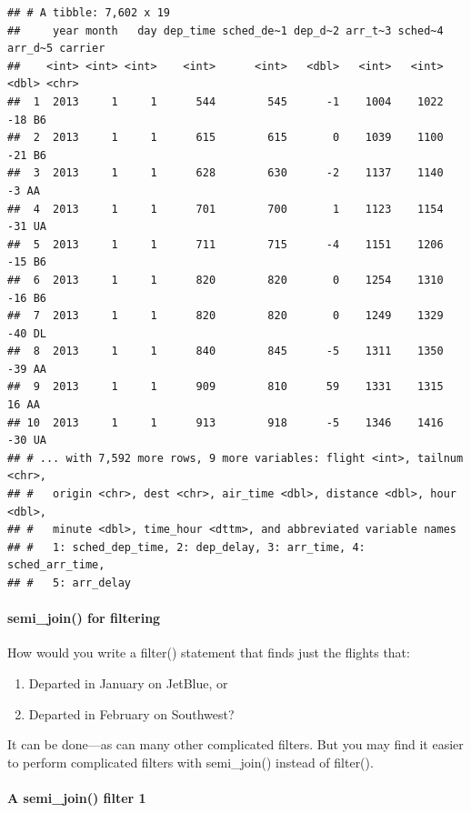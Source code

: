 \documentclass[
]{article}
\providecommand{\tightlist}{%
  \setlength{\itemsep}{0pt}\setlength{\parskip}{0pt}}
\begin{document}
\begin{verbatim}
## # A tibble: 7,602 x 19
##     year month   day dep_time sched_de~1 dep_d~2 arr_t~3 sched~4 arr_d~5 carrier
##    <int> <int> <int>    <int>      <int>   <dbl>   <int>   <int>   <dbl> <chr>  
##  1  2013     1     1      544        545      -1    1004    1022     -18 B6     
##  2  2013     1     1      615        615       0    1039    1100     -21 B6     
##  3  2013     1     1      628        630      -2    1137    1140      -3 AA     
##  4  2013     1     1      701        700       1    1123    1154     -31 UA     
##  5  2013     1     1      711        715      -4    1151    1206     -15 B6     
##  6  2013     1     1      820        820       0    1254    1310     -16 B6     
##  7  2013     1     1      820        820       0    1249    1329     -40 DL     
##  8  2013     1     1      840        845      -5    1311    1350     -39 AA     
##  9  2013     1     1      909        810      59    1331    1315      16 AA     
## 10  2013     1     1      913        918      -5    1346    1416     -30 UA     
## # ... with 7,592 more rows, 9 more variables: flight <int>, tailnum <chr>,
## #   origin <chr>, dest <chr>, air_time <dbl>, distance <dbl>, hour <dbl>,
## #   minute <dbl>, time_hour <dttm>, and abbreviated variable names
## #   1: sched_dep_time, 2: dep_delay, 3: arr_time, 4: sched_arr_time,
## #   5: arr_delay
\end{verbatim}

\hypertarget{semi_join-for-filtering}{%
\paragraph{semi\_join() for filtering}\label{semi_join-for-filtering}}

How would you write a filter() statement that finds just the flights
that:

\begin{enumerate}
\def\labelenumi{\arabic{enumi}.}
\tightlist
\item
  Departed in January on JetBlue, or
\item
  Departed in February on Southwest?
\end{enumerate}

It can be done---as can many other complicated filters. But you may find
it easier to perform complicated filters with semi\_join() instead of
filter().

\hypertarget{a-semi_join-filter-1}{%
\paragraph{A semi\_join() filter 1}\label{a-semi_join-filter-1}}
\end{document}
